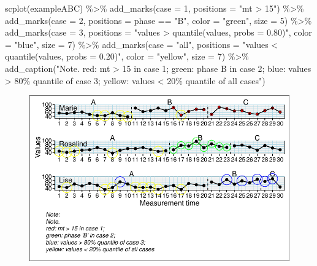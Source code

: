 \documentclass[
  letterpaper,
  DIV=11,
  numbers=noendperiod]{scrreprt}
\newenvironment{Shaded}{\begin{snugshade}}{\end{snugshade}}
\newcommand{\AttributeTok}[1]{\textcolor[rgb]{0.40,0.45,0.13}{#1}}
\newcommand{\DecValTok}[1]{\textcolor[rgb]{0.68,0.00,0.00}{#1}}
\newcommand{\FunctionTok}[1]{\textcolor[rgb]{0.28,0.35,0.67}{#1}}
\newcommand{\NormalTok}[1]{\textcolor[rgb]{0.00,0.23,0.31}{#1}}
\newcommand{\SpecialCharTok}[1]{\textcolor[rgb]{0.37,0.37,0.37}{#1}}
\newcommand{\StringTok}[1]{\textcolor[rgb]{0.13,0.47,0.30}{#1}}
\begin{document}
\begin{Shaded}
\begin{Highlighting}[]
\FunctionTok{scplot}\NormalTok{(exampleABC) }\SpecialCharTok{\%\textgreater{}\%}
  \FunctionTok{add\_marks}\NormalTok{(}\AttributeTok{case =} \DecValTok{1}\NormalTok{, }\AttributeTok{positions =} \StringTok{"mt \textgreater{} 15"}\NormalTok{) }\SpecialCharTok{\%\textgreater{}\%}
  \FunctionTok{add\_marks}\NormalTok{(}\AttributeTok{case =} \DecValTok{2}\NormalTok{, }\AttributeTok{positions =} \StringTok{\textquotesingle{}phase == "B"\textquotesingle{}}\NormalTok{, }\AttributeTok{color =} \StringTok{"green"}\NormalTok{, }\AttributeTok{size =} \DecValTok{5}\NormalTok{) }\SpecialCharTok{\%\textgreater{}\%}
  \FunctionTok{add\_marks}\NormalTok{(}\AttributeTok{case =} \DecValTok{3}\NormalTok{, }\AttributeTok{positions =} \StringTok{"values \textgreater{} quantile(values, probs = 0.80)"}\NormalTok{, }\AttributeTok{color =} \StringTok{"blue"}\NormalTok{, }\AttributeTok{size =} \DecValTok{7}\NormalTok{) }\SpecialCharTok{\%\textgreater{}\%}
  \FunctionTok{add\_marks}\NormalTok{(}\AttributeTok{case =} \StringTok{"all"}\NormalTok{, }\AttributeTok{positions =} \StringTok{"values \textless{} quantile(values, probs = 0.20)"}\NormalTok{, }\AttributeTok{color =} \StringTok{"yellow"}\NormalTok{, }\AttributeTok{size =} \DecValTok{7}\NormalTok{) }\SpecialCharTok{\%\textgreater{}\%}
  \FunctionTok{add\_caption}\NormalTok{(}\StringTok{"Note.}
\StringTok{red: mt \textgreater{} 15 in case 1; }
\StringTok{green: phase \textquotesingle{}B\textquotesingle{} in case 2; }
\StringTok{blue: values \textgreater{} 80\% quantile of case 3; }
\StringTok{yellow: values \textless{} 20\% quantile of all cases"}\NormalTok{)}
\end{Highlighting}
\end{Shaded}

\begin{figure}[H]

{\centering \includegraphics{./ch_scplot_files/figure-pdf/scplot-marks-2-1.pdf}

}

\end{figure}
\end{document}
